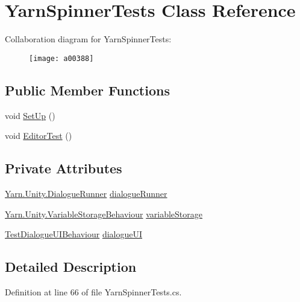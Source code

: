 \hypertarget{a00175}{\section{Yarn\-Spinner\-Tests Class Reference}
\label{a00175}
}


Collaboration diagram for Yarn\-Spinner\-Tests\-:
\nopagebreak
\begin{figure}[H]
\begin{center}
\leavevmode
\texttt{[image: a00388]}
\end{center}
\end{figure}
\subsection*{Public Member Functions}
\begin{DoxyCompactItemize}
\item 
void \hyperlink{a00175_ad6e4c6a92bb5ed6187949264df6aaf1b}{Set\-Up} ()
\item 
void \hyperlink{a00175_a60ab8ed8dc30ec30e74baa1916d47324}{Editor\-Test} ()
\end{DoxyCompactItemize}
\subsection*{Private Attributes}
\begin{DoxyCompactItemize}
\item 
\hyperlink{a00089}{Yarn.\-Unity.\-Dialogue\-Runner} \hyperlink{a00175_a9791840e0b5987e5bd09bce83ce2d8d9}{dialogue\-Runner}
\item 
\hyperlink{a00168}{Yarn.\-Unity.\-Variable\-Storage\-Behaviour} \hyperlink{a00175_a27dbc8c3f7f23ce142d1d5d1fd3df8bc}{variable\-Storage}
\item 
\hyperlink{a00153}{Test\-Dialogue\-U\-I\-Behaviour} \hyperlink{a00175_aace025d2a9a703154a1989c47b0a0737}{dialogue\-U\-I}
\end{DoxyCompactItemize}


\subsection{Detailed Description}


Definition at line 66 of file Yarn\-Spinner\-Tests.\-cs.



